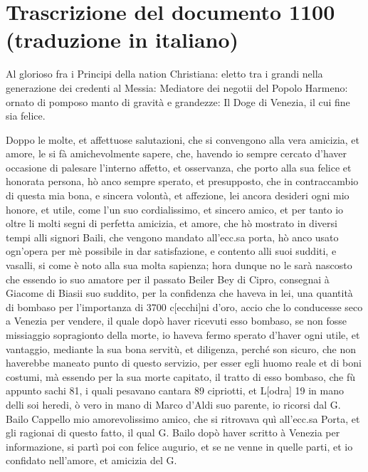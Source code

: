 \section{Trascrizione del documento 1100 (traduzione in italiano)}

\label{sec:dragomanno}

Al  glorioso fra  i Principi  della  nation Christiana:  eletto tra  i
grandi nella generazione dei credenti al Messia: Mediatore dei negotii
del Popolo Harmeno: ornato di pomposo manto di gravità e grandezze: Il
Doge di Venezia, il cui fine sia felice.

Doppo le molte, et affettuose salutazioni, che si convengono alla vera
amicizia, et  amore, le si  fà amichevolmente sapere, che,  havendo io
sempre  cercato d'haver  occasione di  palesare l'interno  affetto, et
osservanza, che  porto alla  sua felice et  honorata persona,  hò anco
sempre  sperato, et presupposto,  che in  contraccambio di  questa mia
bona, e  sincera volontà, et  affezione, lei ancora desideri  ogni mio
honore, et  utile, come l'un  suo cordialissimo, et sincero  amico, et
per tanto io oltre li molti  segni di perfetta amicizia, et amore, che
hò mostrato in  diversi tempi alli signori Baili,  che vengono mandato
all'ecc.sa  porta, hò  anco usato  ogn'opera per  mè possibile  in dar
satisfazione, e contento alli suoi  sudditi, e vasalli, si come è noto
alla sua molta  sapienza; hora dunque no le  sarà nascosto che essendo
io suo amatore per il passato Beiler Bey di Cipro, consegnai à Giacome
di  Biasii suo  suddito,  per la  confidenza  che haveva  in lei,  una
quantità di  bombaso per l'importanza di 3700  c[ecchi]ni d'oro, accio
che  lo conducesse seco  a Venezia  per vendere,  il quale  dopò haver
ricevuti  esso  bombaso, se  non  fosse  missiaggio sopragionto  della
morte,  io haveva  fermo  sperato d'haver  ogni  utile, et  vantaggio,
mediante la sua bona servitù, et diligenza, perché son sicuro, che non
haverebbe maneato punto di questo servizio, per esser egli huomo reale
et di boni costumi, mà essendo per la sua morte capitato, il tratto di
esso bombaso,  che fù  appunto sachi 81,  i quali pesavano  cantara 89
cipriotti, et L[odra]  19 in mano delli soi heredi, ò  vero in mano di
Marco  d'Aldi suo  parente,  io  ricorsi dal  G.   Bailo Cappello  mio
amorevolissimo amico,  che si ritrovava  quì all'ecc.sa Porta,  et gli
ragionai  di questo  fatto, il  qual G.   Bailo dopò  haver  scritto à
Venezia per  informazione, si partì poi  con felice augurio,  et se ne
venne in quelle parti, et  io confidato nell'amore, et amicizia del G.
